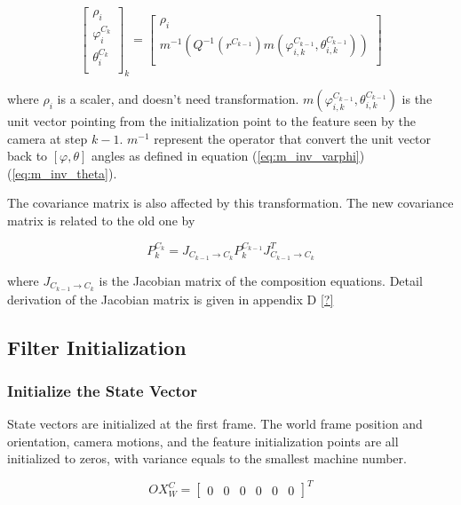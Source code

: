 \begin{equation}
\begin{bmatrix}
\rho_{i} \\
\varphi_{i}^{C_{k}} \\
\theta_{i}^{C_{k}} \\
\end{bmatrix}_{k}=
\begin{bmatrix}
\rho _{i} \\
m^{-1}\left(Q^{-1}(r^{C_{k-1}})m(\varphi _{i, k}^{C_{k-1}}, \theta _{i, k}^{C_{k-1}})\right) \\
\end{bmatrix}
\end{equation}

\noindent where $\rho_i$ is a scaler, and doesn't need transformation.
$m(\varphi_{i, k}^{C_{k-1}}, \theta_{i, k}^{C_{k-1}})$ is the unit
vector pointing from the initialization point to the feature seen by
the camera at step $k-1$. $m^{-1}$ represent the operator that convert
the unit vector back to $[\varphi, \theta]$ angles as defined in
equation (\ref{eq:m_inv_varphi}) (\ref{eq:m_inv_theta}).

The covariance matrix is also affected by this transformation. The new
covariance matrix is related to the old one by

\begin{equation}
P_{k}^{C_{k}}=J_{C_{k-1}\to C_{k}}P_{k}^{C_{k-1}}J_{C_{k-1}\to C_{k}}^{T}
\end{equation}

\noindent where $J_{C_{k-1} \to C_k}$ is the Jacobian matrix of the
composition equations. Detail derivation of the Jacobian matrix is
given in appendix D \ref{?}  

\subsection{Filter Initialization}
\subsubsection{Initialize the State Vector}

State vectors are initialized at the first frame. The world frame
position and orientation, camera motions, and the feature
initialization points are all initialized to zeros, with variance
equals to the smallest machine number.

\begin{equation}
\label{eq:OX_init}
OX_{W}^{C}=\begin{bmatrix}0&0&0&0&0&0\end{bmatrix}^T 
\end{equation}


